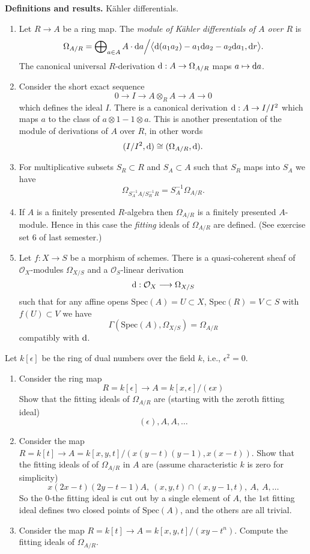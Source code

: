 \noindent
{\bf Definitions and results.} K\"ahler differentials.
\begin{enumerate}
\item Let $R \to A$ be a ring map. The {\it module of K\"ahler
differentials of $A$ over $R$} is
$$
\Omega_{A/R} = \bigoplus\nolimits_{a\in A} A \cdot {\rm d}a \Big/
\big\langle {\rm d}(a_1a_2)-a_1{\rm d}a_2-a_2{\rm d}a_1, {\rm d}r\big\rangle.
$$
The canonical universal $R$-derivation ${\rm d} : A \to \Omega_{A/R}$
maps $a\mapsto {\rm d}a$.
\item Consider the short exact sequence
$$
0 \to I \to A\otimes_R A \to A \to 0
$$
which defines the ideal $I$. There is a canonical derivation
${\rm d} : A \to I/I^2$ which maps $a$ to the class of
$a\otimes 1 - 1 \otimes a$. This is another presentation of
the module of derivations of $A$ over $R$, in other words
$$
(I/I^2, {\rm d}) \cong (\Omega_{A/R}, {\rm d}).
$$
\item For multiplicative subsets $S_R \subset R$ and
$S_A \subset A$ such that $S_R$ maps into $S_A$ we have
$$
\Omega_{S_A^{-1}A / S_R^{-1}R} =
S_A^{-1}\Omega_{A/R}.
$$
\item If $A$ is a finitely presented $R$-algebra then
$\Omega_{A/R}$ is a finitely presented $A$-module. Hence in
this case the {\it fitting} ideals of $\Omega_{A/R}$ are defined.
(See exercise set 6 of last semester.)
\item Let $f : X \to S$ be a morphism of schemes. There is
a quasi-coherent sheaf of ${\mathcal O}_X$-modules $\Omega_{X/S}$
and a ${\mathcal O}_S$-linear derivation
$$
{\rm d} : {\mathcal O}_X \longrightarrow \Omega_{X/S}
$$
such that for any affine opens $\text{Spec}(A) = U \subset X$,
$\text{Spec}(R) = V \subset S$
with $f(U) \subset V$ we have
$$
\Gamma(\text{Spec}(A), \Omega_{X/S}) = \Omega_{A/R}
$$
compatibly with ${\rm d}$.
\end{enumerate}

\begin{exercise}
\label{exercise-dual-numbers}
Let $k[\epsilon]$ be the ring of dual numbers
over the field $k$, i.e., $\epsilon^2 = 0$.
\begin{enumerate}
\item Consider the ring map
$$
R = k[\epsilon] \to A = k[x, \epsilon]/(\epsilon x)
$$
Show that the fitting ideals of $\Omega_{A/R}$ are (starting with the
zeroth fitting ideal)
$$
(\epsilon), A, A, \ldots
$$
\item Consider the map $R = k[t] \to
A = k[x, y, t]/(x(y-t)(y-1), x(x-t))$. Show that the fitting ideals of
of $\Omega_{A/R}$ in $A$ are (assume characteristic $k$ is zero
for simplicity)
$$
x(2x-t)(2y-t-1)A, \ (x, y, t)\cap (x, y-1, t), \ A, \ A, \ldots
$$
So the $0$-the fitting ideal is cut out by a single element of $A$,
the $1$st fitting ideal defines two closed points of $\text{Spec}(A)$, and
the others are all trivial.
\item Consider the map $R = k[t] \to A = k[x, y, t]/(xy-t^n)$.
Compute the fitting ideals of $\Omega_{A/R}$.
\end{enumerate}
\end{exercise}

